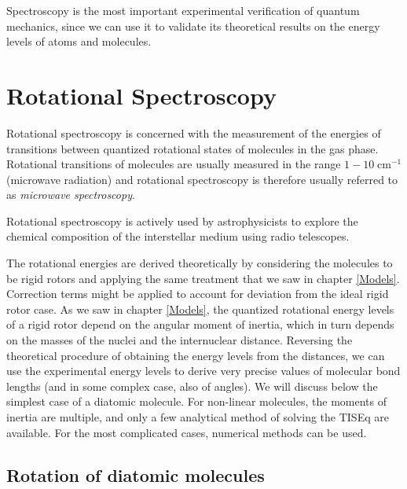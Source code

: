 \documentclass[
  9pt,
]{extbook}
\theoremstyle{definition}
\theoremstyle{definition}
\theoremstyle{definition}
\theoremstyle{remark}
\begin{document}
Spectroscopy is the most important experimental verification of quantum mechanics, since we can use it to validate its theoretical results on the energy levels of atoms and molecules.

\hypertarget{rotational-spectroscopy}{%
\section{Rotational Spectroscopy}\label{rotational-spectroscopy}}

Rotational spectroscopy is concerned with the measurement of the energies of transitions between quantized rotational states of molecules in the gas phase. Rotational transitions of molecules are usually measured in the range \(1-10\; \text{cm}^{-1}\) (microwave radiation) and rotational spectroscopy is therefore usually referred to as \emph{microwave spectroscopy}.

Rotational spectroscopy is actively used by astrophysicists to explore the chemical composition of the interstellar medium using radio telescopes.

The rotational energies are derived theoretically by considering the molecules to be rigid rotors and applying the same treatment that we saw in chapter \ref{Models}. Correction terms might be applied to account for deviation from the ideal rigid rotor case. As we saw in chapter \ref{Models}, the quantized rotational energy levels of a rigid rotor depend on the angular moment of inertia, which in turn depends on the masses of the nuclei and the internuclear distance. Reversing the theoretical procedure of obtaining the energy levels from the distances, we can use the experimental energy levels to derive very precise values of molecular bond lengths (and in some complex case, also of angles). We will discuss below the simplest case of a diatomic molecule. For non-linear molecules, the moments of inertia are multiple, and only a few analytical method of solving the TISEq are available. For the most complicated cases, numerical methods can be used.

\hypertarget{rotation-of-diatomic-molecules}{%
\subsection{Rotation of diatomic molecules}\label{rotation-of-diatomic-molecules}}
\end{document}
